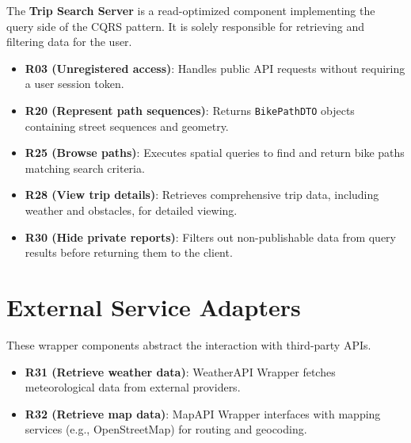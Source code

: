 The \textbf{Trip Search Server} is a read-optimized component implementing the query side of the CQRS pattern. It is solely responsible for retrieving and filtering data for the user.

\begin{itemize}
    \item \textbf{R03 (Unregistered access)}: Handles public API requests without requiring a user session token.
    \item \textbf{R20 (Represent path sequences)}: Returns \texttt{BikePathDTO} objects containing street sequences and geometry.
    \item \textbf{R25 (Browse paths)}: Executes spatial queries to find and return bike paths matching search criteria.
    \item \textbf{R28 (View trip details)}: Retrieves comprehensive trip data, including weather and obstacles, for detailed viewing.
    \item \textbf{R30 (Hide private reports)}: Filters out non-publishable data from query results before returning them to the client.
\end{itemize}

\section*{External Service Adapters}

These wrapper components abstract the interaction with third-party APIs.

\begin{itemize}
    \item \textbf{R31 (Retrieve weather data)}: WeatherAPI Wrapper fetches meteorological data from external providers.
    \item \textbf{R32 (Retrieve map data)}: MapAPI Wrapper interfaces with mapping services (e.g., OpenStreetMap) for routing and geocoding.
\end{itemize}